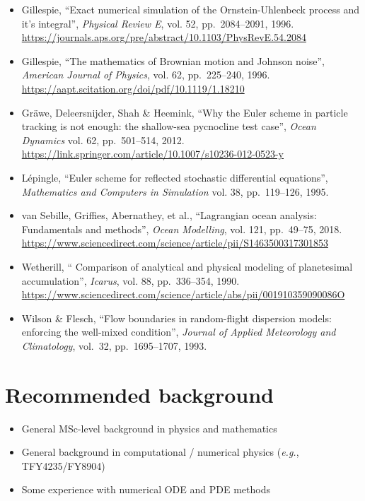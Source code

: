 \documentclass{article}
\begin{document}
\begin{itemize}
\item Gillespie, ``Exact numerical simulation of the Ornstein-Uhlenbeck process and it's integral'', \emph{Physical Review E}, vol. 52, pp.~2084--2091, 1996.\\
    \url{https://journals.aps.org/pre/abstract/10.1103/PhysRevE.54.2084}

\item Gillespie, ``The mathematics of Brownian motion and Johnson noise'', \emph{American Journal of Physics}, vol. 62, pp.~225--240, 1996.\\
    \url{https://aapt.scitation.org/doi/pdf/10.1119/1.18210}

\item Gräwe, Deleersnijder, Shah \& Heemink, ``Why the Euler scheme in particle tracking is not enough: the shallow-sea pycnocline test case'', \emph{Ocean Dynamics} vol. 62, pp.~501--514, 2012. \\
\url{https://link.springer.com/article/10.1007/s10236-012-0523-y}

\item Lépingle, ``Euler scheme for reflected stochastic differential equations'', \emph{Mathematics and Computers in Simulation} vol. 38, pp.~119--126, 1995.

\item van Sebille, Griffies, Abernathey, et al., ``Lagrangian ocean analysis: Fundamentals and methods'', \emph{Ocean Modelling}, vol. 121, pp.~49--75, 2018. \\
    \url{https://www.sciencedirect.com/science/article/pii/S1463500317301853}

\item Wetherill, `` Comparison of analytical and physical modeling of planetesimal accumulation'', \emph{Icarus}, vol. 88, pp.~336--354, 1990. \\
    \url{https://www.sciencedirect.com/science/article/abs/pii/001910359090086O}

\item Wilson \& Flesch, ``Flow boundaries in random-flight dispersion models: enforcing the well-mixed condition'', \emph{Journal of Applied Meteorology and Climatology}, vol.~32, pp.~1695--1707, 1993.
\end{itemize}

\section{Recommended background}
\begin{itemize}
    \item General MSc-level background in physics and mathematics
    \item General background in computational / numerical physics (\emph{e.g.}, TFY4235/FY8904)
    \item Some experience with numerical ODE and PDE methods
\end{itemize}
\end{document}
